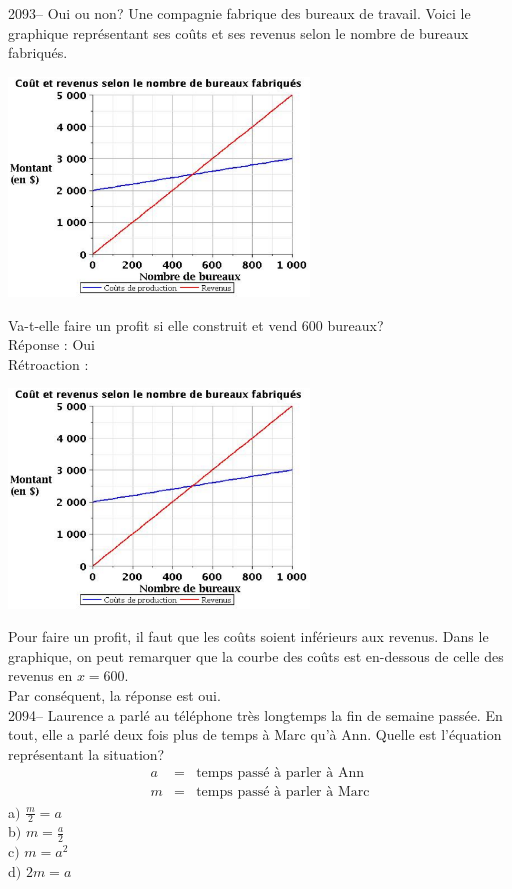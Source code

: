 \documentclass[letterpaper, 12pt]{article}
\begin{document}
2093--  Oui ou non? Une compagnie fabrique des bureaux de travail. Voici le graphique repr\'esentant ses co\^uts et ses revenus selon le nombre de bureaux fabriqu\'es.
\begin{center}
 \includegraphics[width=8cm,bb=14 14 563 415]{Q2092v.eps}
\end{center}
Va-t-elle faire un profit si elle construit et vend 600 bureaux?\\

R\'eponse : Oui\\

R\'etroaction :
\begin{center}
 \includegraphics[width=8cm,bb=14 14 563 415]{Q2092v.eps}
\end{center}
Pour faire un profit, il faut que les co\^uts soient inf\'erieurs aux revenus. Dans le graphique, on peut remarquer que la courbe des  co\^uts est en-dessous de celle des revenus en $x=600$.\\
Par cons\'equent, la r\'eponse est oui.\\

2094-- Laurence a parl\'e au t\'el\'ephone tr\`es longtemps la fin de semaine pass\'ee. En tout, elle a parl\'e deux fois plus de temps \`a Marc qu'\`a Ann. Quelle est l'\'equation repr\'esentant la situation?
\begin{eqnarray*}
 a &=& \textrm{temps pass\'e \`a parler \`a Ann} \\
m &=& \textrm{temps pass\'e \`a parler \`a Marc}
\end{eqnarray*}
a$)$ $\frac{m}{2}=a$\\[2mm]
b$)$ $m=\frac{a}{2}$\\[2mm]
c$)$ $m=a^{2}$\\[2mm]
d$)$ $2m=a$\\
\end{document}
